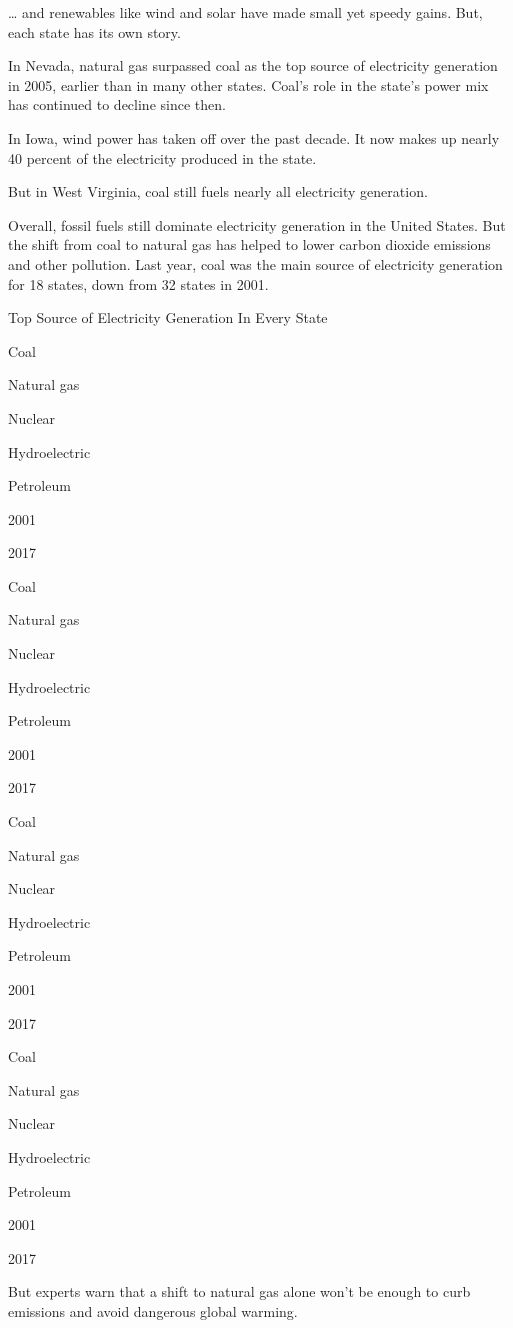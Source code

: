 \ldots{} and renewables like wind and solar have made small yet speedy
gains. But, each state has its own story.

In Nevada, natural gas surpassed coal as the top source of electricity
generation in 2005, earlier than in many other states. Coal's role in
the state's power mix has continued to decline since then.

In Iowa, wind power has taken off over the past decade. It now makes up
nearly 40 percent of the electricity produced in the state.

But in West Virginia, coal still fuels nearly all electricity
generation.

Overall, fossil fuels still dominate electricity generation in the
United States. But the shift from coal to natural gas has helped to
lower carbon dioxide emissions and other pollution. Last year, coal was
the main source of electricity generation for 18 states, down from 32
states in 2001.

Top Source of Electricity Generation In Every State

Coal

Natural gas

Nuclear

Hydroelectric

Petroleum

2001

2017

Coal

Natural gas

Nuclear

Hydroelectric

Petroleum

2001

2017

Coal

Natural gas

Nuclear

Hydroelectric

Petroleum

2001

2017

Coal

Natural gas

Nuclear

Hydroelectric

Petroleum

2001

2017

But experts warn that a shift to natural gas alone won't be enough to
curb emissions and avoid dangerous global warming.

